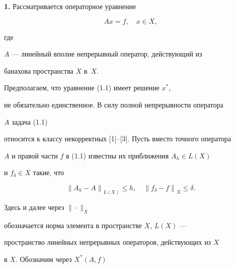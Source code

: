 \date{}




\pagestyle{plain} %







\maketitle


\label{begin}








{\bf 1.} Рассматривается операторное уравнение


\begin{equation}


Ax=f, \quad x \in X,\tag{1.1}


\end{equation}


где


$A$ --- линейный вполне непрерывный оператор, действующий из


банахова пространства $X$ в~$X$.


Предполагаем, что уравнение (1.1) имеет решение $x^{*}$,


не обязательно единственное. В силу полной непрерывности оператора


$A$ задача (1.1)


относится к классу некорректных [1]--[3]. Пусть вместо точного оператора


$A$ и правой части $f$ в (1.1) известны их приближения $A_h \in L(X)$


и $f_{\delta} \in X$ такие, что


\begin{equation}


{\| A_h -A\|}_{ L(X)} \leq h, \quad


{\| f_{\delta} -f\|}_X \leq \delta. \tag{1.2}


\end{equation}


Здесь и далее через $\| \cdot \|_X$


обозначается норма элемента в пространстве $X$, $L(X)$ ---


пространство линейных непрерывных операторов, действующих из $X$


в $X$. Обозначим через $X^{*}(A,f)$



